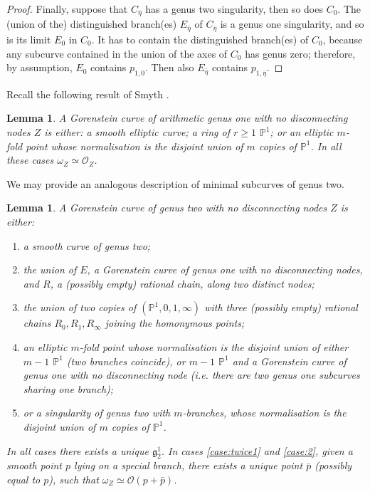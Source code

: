 \documentclass[11pt]{amsart}
\newcommand{\PP}{\mathbb P}
\newcommand{\OO}{\mathcal O}
\theoremstyle{plain}
\newtheorem{lem}[thm]{Lemma}
\theoremstyle{definition}
\begin{document}
\begin{proof}
 Finally, suppose that $C_{\bar\eta}$ has a genus two singularity, then so does $C_0$. The (union of the) distinguished branch(es) $E_{\bar\eta}$ of $C_{\bar\eta}$ is a genus one singularity, and so is its limit $E_0$ in $C_0$. It has to contain the distinguished branch(es) of $C_0$, because any subcurve contained in the union of the axes of $C_0$ has genus zero; therefore, by assumption, $E_0$ contains $p_{1,0}$. Then also $E_{\bar\eta}$ contains $p_{1,\bar\eta}$.
\end{proof}

Recall the following result of Smyth \cite[Lemma 3.3]{SMY1}.
\begin{lem}\label{lem:min1}
 A Gorenstein curve of arithmetic genus one with no disconnecting nodes $Z$ is either: a smooth elliptic curve; a ring of $r\geq 1$ $\PP^1$; or an elliptic $m$-fold point whose normalisation is the disjoint union of $m$ copies of $\PP^1$. In all these cases $\omega_Z\simeq\OO_Z$.
\end{lem}

We may provide an analogous description of minimal subcurves of genus two.
\begin{lem}\label{lem:min2}
 A Gorenstein curve of genus two with no disconnecting nodes $Z$ is either:
 \begin{enumerate}
  \item a smooth curve of genus two;
  \item the union of $E$, a Gorenstein curve of genus one with no disconnecting nodes, and $R$, a (possibly empty) rational chain, along two distinct nodes;
  \item the union of two copies of $(\PP^1,0,1,\infty)$ with three (possibly empty) rational chains $R_0, R_1, R_\infty$ joining the homonymous points;
  \item\label{case:twice1} an elliptic $m$-fold point whose normalisation is the disjoint union of either $m-1$ $\PP^1$ (two branches coincide), or $m-1$ $\PP^1$ and a Gorenstein curve of genus one with no disconnecting node (i.e. there are two genus one subcurves sharing one branch);
  \item\label{case:2} or a singularity of genus two with $m$-branches, whose normalisation is the disjoint union of $m$ copies of $\PP^1$.
 \end{enumerate}
In all cases there exists a unique $\mathfrak g^1_2$. In cases \eqref{case:twice1} and \eqref{case:2}, given a smooth point $p$ lying on a special branch, there exists a unique point $\bar p$ (possibly equal to $p$), such that $\omega_Z\simeq\OO(p+\bar p)$.
\end{lem}
\end{document}
